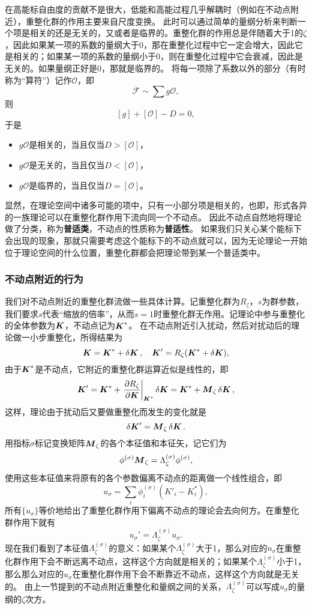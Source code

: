 \documentclass[hyperref, UTF8, a4paper]{ctexart}
\begin{document}
在高能标自由度的贡献不是很大，低能和高能过程几乎解耦时（例如在不动点附近），重整化群的作用主要来自尺度变换。
此时可以通过简单的量纲分析来判断一个项是相关的还是无关的，又或者是临界的。重整化群的作用总是伴随着大于1的$\zeta$，因此如果某一项的系数的量纲大于$0$，那在重整化过程中它一定会增大，因此它是相关的；如果某一项的系数的量纲小于$0$，则在重整化过程中它会衰减，因此是无关的。如果量纲正好是$0$，那就是临界的。
将每一项除了系数以外的部分（有时称为“算符”）记作$\mathcal{O}$，即
\[
    \mathcal{F} \sim \sum g \mathcal{O},
\]
则
\[
    [g] + [\mathcal{O}] - D = 0,
\]
于是
\begin{itemize}
    \item $g \mathcal{O}$是相关的，当且仅当$D > [\mathcal{O}]$，
    \item $g \mathcal{O}$是无关的，当且仅当$D < [\mathcal{O}]$，
    \item $g \mathcal{O}$是临界的，当且仅当$D = [\mathcal{O}]$。
\end{itemize}

显然，在理论空间中诸多可能的项中，只有一小部分项是相关的，也即，形式各异的一族理论可以在重整化群作用下流向同一个不动点。
因此不动点自然地将理论做了分类，称为\textbf{普适类}，不动点的性质称为\textbf{普适性}。
如果我们只关心某个能标下会出现的现象，那就只需要考虑这个能标下的不动点就可以，因为无论理论一开始位于理论空间的什么位置，重整化群都会把理论带到某一个普适类中。

\subsubsection{不动点附近的行为}

我们对不动点附近的重整化群流做一些具体计算。记重整化群为$R_\zeta$，$s$为群参数，我们要求$s$代表“缩放的倍率”，从而$s=1$时重整化群无作用。记理论中参与重整化的全体参数为$\vb*{K}$，不动点记为$\vb*{K}^*$。
在不动点附近引入扰动，然后对扰动后的理论做一小步重整化，所得结果为
\[
    \vb*{K} = \vb*{K}^* + \var{\vb*{K}} , \quad \vb*{K}' = R_\zeta(\vb*{K}^* + \var{\vb*{K}}),
\]
由于$\vb*{K}^*$是不动点，它附近的重整化群运算近似是线性的，即
\[
    \vb*{K}' = \vb*{K}^* + \eval{\pdv{R_\zeta}{\vb*{K}}}_{\vb*{K}^*} \var{\vb*{K}} = \vb*{K}^* + \vb*{M}_\zeta \var{\vb*{K}},
\]
这样，理论由于扰动后又要做重整化而发生的变化就是
\[
    \var{\vb*{K}'} = \vb*{M}_\zeta \var{\vb*{K}}.
\]
用指标$\sigma$标记变换矩阵$\vb*{M}_\zeta$的各个本征值和本征矢，记它们为
\[
    \phi^{(\sigma)} \vb*{M}_\zeta = \Lambda^{(\sigma)}_\zeta \phi^{(\sigma)},
\]
使用这些本征值来将原有的各个参数偏离不动点的距离做一个线性组合，即
\[
    u_\sigma = \sum_i \phi^{(\sigma)}_i (K'_i - K^*_i), 
\]
所有$\{u_\sigma\}$等价地给出了重整化群作用下偏离不动点的理论会去向何方。在重整化群作用下就有
\[
    u_\sigma' = \Lambda^{(\sigma)}_\zeta u_\sigma.
\]
现在我们看到了本征值$\Lambda_\zeta^{(\sigma)}$的意义：如果某个$\Lambda_\zeta^{(\sigma)}$大于1，那么对应的$u_\sigma$在重整化群作用下会不断远离不动点，这样这个方向就是相关的；如果某个$\Lambda_\zeta^{(\sigma)}$小于1，那么那么对应的$u_\sigma$在重整化群作用下会不断靠近不动点，这样这个方向就是无关的。
由上一节提到的不动点附近重整化和量纲之间的关系，$\Lambda_\zeta^{(\sigma)}$可以写成$u_\sigma$的量纲的$\zeta$次方。
\end{document}
